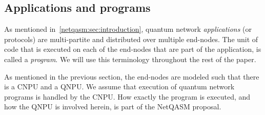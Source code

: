 \subsection{Applications and programs}
As mentioned in~\cref{netqasm:sec:introduction}, quantum network \textit{applications} (or protocols) are multi-partite and distributed over multiple end-nodes.
The unit of code that is executed on each of the end-nodes that are part of the application, is called a \textit{program}.
We will use this terminology throughout the rest of the paper.

As mentioned in the previous section, the end-nodes are modeled such that there is a \ac{CNPU} and a \ac{QNPU}. We assume that execution of quantum network programs is handled by the \ac{CNPU}.
How exactly the program is executed, and how the \ac{QNPU} is involved herein, is part of the \ac{NetQASM} proposal.